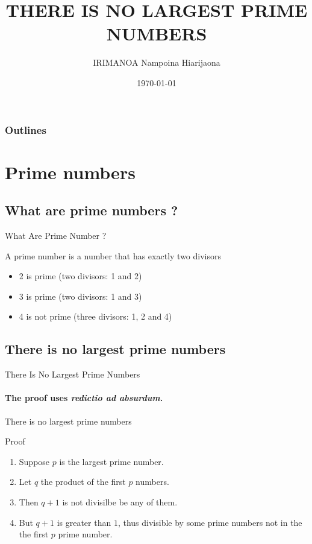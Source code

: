 \documentclass[compress]{beamer}
\title{THERE IS NO LARGEST PRIME NUMBERS}
\author[]{IRIMANOA Nampoina Hiarijaona}
\institute{CRIAT MAdagascar \\ Center Antananarivo}
\date{\today}
\begin{document}
\begin{frame}[plain]
    \maketitle\end{frame}

\begin{frame}[plain]
	\frametitle{Outlines}
	\tableofcontents
\end{frame}

\section{Prime numbers}
\subsection{What are prime numbers ?}
\begin{frame}{What Are Prime Number ?}
	\begin{tcolorbox}[definition, title=Definition]
		A prime number is a number that has exactly two divisors
	\end{tcolorbox}
	\begin{tcolorbox}[example, title=Exemple]
		\begin{itemize}
			\item 2 is prime (two divisors: 1 and 2)
			\item 3 is prime (two divisors: 1 and 3)
			\item 4 is not prime (three divisors: 1, 2 and 4)
		\end{itemize}
	\end{tcolorbox}
\end{frame}

\subsection{There is no largest prime numbers}
\begin{frame}{There Is No Largest Prime Numbers}
	\transdissolve
	\framesubtitle{The proof uses \textit{redictio ad absurdum}.}
	
	\begin{tcolorbox}[theorem, title=Theorem]
		There is no largest prime numbers
	\end{tcolorbox}
	
	\begin{bclogo}[couleur=myred!9,couleurBarre=myred,arrondi=0.2,logo=\bclampe,noborder=true,marge=10]{  Proof}
		\begin{enumerate}
			\item Suppose $p$ is the largest prime number.
			\item Let $q$ the product of the first $p$ numbers.
			\item Then $q + 1$ is not divisilbe be any of them.
			\item But $q + 1$ is greater than $1$, thus divisible by some prime numbers not in the the first $p$ prime number.\qedhere 
		\end{enumerate}
	\end{bclogo}
\end{frame}
\end{document}
